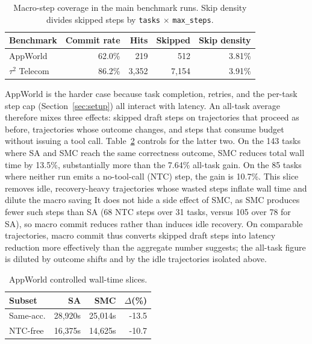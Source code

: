 \begin{table}[t]
\centering
\small
\caption{Macro-step coverage in the main benchmark runs. Skip density divides skipped steps by \texttt{tasks} $\times$ \texttt{max\_steps}.}
\label{tab:macro-coverage}
\begin{tabular}{lrrrr}
\toprule
Benchmark & Commit rate & Hits & Skipped & Skip density \\
\midrule
AppWorld & 62.0\% & 219 & 512 & 3.81\% \\
$\tau^2$ Telecom & 86.2\% & 3,352 & 7,154 & 3.91\% \\
\bottomrule
\end{tabular}
\end{table}

AppWorld is the harder case because task completion, retries, and the per-task step cap (Section~\ref{sec:setup}) all interact with latency. 
An all-task average therefore mixes three effects: skipped draft steps on trajectories that proceed as before, trajectories whose outcome changes, and steps that consume budget without issuing a tool call.
Table~\ref{tab:appworld-slices} controls for the latter two. 
On the 143 tasks where SA and SMC reach the same correctness outcome, SMC reduces total wall time by 13.5\%, substantially more than the 7.64\% all-task gain. 
On the 85 tasks where neither run emits a no-tool-call (NTC) step, the gain is 10.7\%. 
This slice removes idle, recovery-heavy trajectories whose wasted steps inflate wall time and dilute the macro saving It does not hide a side effect of SMC, as SMC produces fewer such steps than SA (68 NTC steps over 31 tasks, versus 105 over 78 for SA), so macro commit reduces rather than induces idle recovery. 
On comparable trajectories, macro commit thus converts skipped draft steps into latency reduction more effectively than the aggregate number suggests; the all-task figure is diluted by outcome shifts and by the idle trajectories isolated above.

\begin{table}[t]
\centering
\small
\caption{AppWorld controlled wall-time slices.}
\label{tab:appworld-slices}
\begin{tabular}{lrrr}
\toprule
Subset & SA & SMC & $\Delta$(\%) \\
\midrule
Same-acc. & 28,920s & 25,014s & -13.5 \\
NTC-free & 16,375s & 14,625s & -10.7 \\
\bottomrule
\end{tabular}
\end{table}

